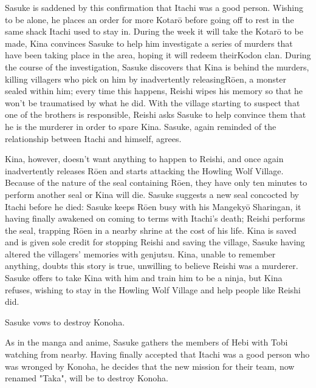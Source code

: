 \documentclass[a4paper,12pt]{article}
\begin{document}
Sasuke is saddened by this confirmation that Itachi was a good person. Wishing to be alone, he places an order for more Kotarō before going off to rest in the same shack Itachi used to stay in. During the week it will take the Kotarō to be made, Kina convinces Sasuke to help him investigate a series of murders that have been taking place in the area, hoping it will redeem theirKodon clan. During the course of the investigation, Sasuke discovers that Kina is behind the murders, killing villagers who pick on him by inadvertently releasingRōen, a monster sealed within him; every time this happens, Reishi wipes his memory so that he won't be traumatised by what he did. With the village starting to suspect that one of the brothers is responsible, Reishi asks Sasuke to help convince them that he is the murderer in order to spare Kina. Sasuke, again reminded of the relationship between Itachi and himself, agrees.\\ \par \vspace{0.5cm}

Kina, however, doesn't want anything to happen to Reishi, and once again inadvertently releases Rōen and starts attacking the Howling Wolf Village. Because of the nature of the seal containing Rōen, they have only ten minutes to perform another seal or Kina will die. Sasuke suggests a new seal concocted by Itachi before he died: Sasuke keeps Rōen busy with his Mangekyō Sharingan, it having finally awakened on coming to terms with Itachi's death; Reishi performs the seal, trapping Rōen in a nearby shrine at the cost of his life. Kina is saved and is given sole credit for stopping Reishi and saving the village, Sasuke having altered the villagers' memories with genjutsu. Kina, unable to remember anything, doubts this story is true, unwilling to believe Reishi was a murderer. Sasuke offers to take Kina with him and train him to be a ninja, but Kina refuses, wishing to stay in the Howling Wolf Village and help people like Reishi did.\\ \par \vspace{0.5cm}

Sasuke vows to destroy Konoha.\\ \par \vspace{0.5cm}

As in the manga and anime, Sasuke gathers the members of Hebi with Tobi watching from nearby. Having finally accepted that Itachi was a good person who was wronged by Konoha, he decides that the new mission for their team, now renamed "Taka", will be to destroy Konoha.\\ \par \vspace{0.5cm}
\end{document}

